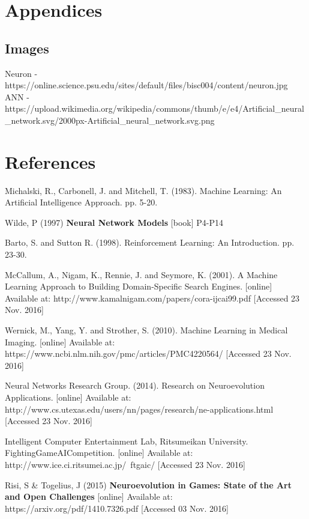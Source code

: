 \documentclass[11pt,a4paper]{article}
\begin{document}
\section{Appendices}
\subsection{Images}
Neuron - https://online.science.psu.edu/sites/default/files/bisc004/content/neuron.jpg
ANN - https://upload.wikimedia.org/wikipedia/commons/thumb/e/e4/Artificial\_neural\_network.svg/2000px-Artificial\_neural\_network.svg.png
\newpage
\section{References}
\begin{thebibliography}{10}

	Michalski, R., Carbonell, J. and Mitchell, T.
	(1983).
	Machine Learning: An Artificial Intelligence Approach. 
	pp. 5-20.
	

	Wilde, P
	(1997)
	\textbf{Neural Network Models}
	[book]
	P4-P14
	
	Barto, S. and Sutton R.
	(1998).
	Reinforcement Learning: An Introduction.
	pp. 23-30.
	
	McCallum, A., Nigam, K., Rennie, J. and Seymore, K.
	(2001).
	A Machine Learning Approach to Building Domain-Specific Search Engines.
	[online]
	Available at: http://www.kamalnigam.com/papers/cora-ijcai99.pdf
	[Accessed 23 Nov. 2016]
	
	Wernick, M., Yang, Y. and Strother, S.
	(2010).
	Machine Learning in Medical Imaging.
	[online]
	Available at: https://www.ncbi.nlm.nih.gov/pmc/articles/PMC4220564/
	[Accessed 23 Nov. 2016]
	
	Neural Networks Research Group.
	(2014).
	Research on Neuroevolution Applications.
	[online]
	Available at: http://www.cs.utexas.edu/users/nn/pages/research/ne-applications.html
	[Accessed 23 Nov. 2016]
	
	Intelligent Computer Entertainment Lab, Ritsumeikan University.
	FightingGameAICompetition.
	[online]
	Available at: http://www.ice.ci.ritsumei.ac.jp/~ftgaic/
	[Accessed 23 Nov. 2016]

	Risi, S \& Togelius, J
	(2015)
	\textbf{Neuroevolution in Games: State of the Art and Open Challenges}
  	[online]
  	Available at: https://arxiv.org/pdf/1410.7326.pdf
  	[Accessed 03 Nov. 2016]


\end{thebibliography}
\end{document}
